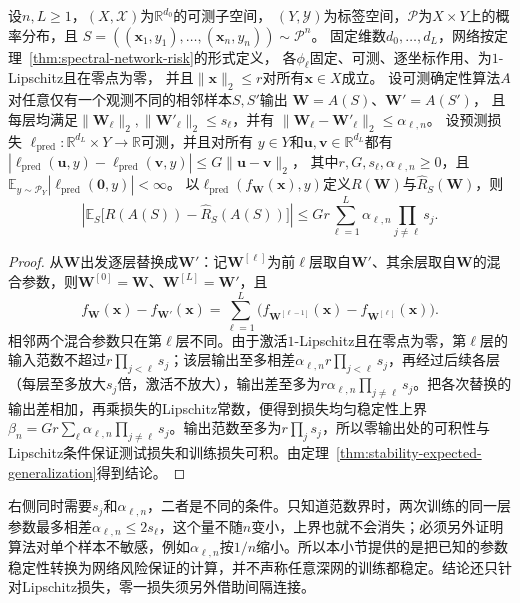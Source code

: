 \begin{theorem}[分层参数稳定性与期望泛化差]
\label{thm:layerwise-parameter-stability}
设$n,L\geq1$，$(X,\mathcal X)$为$\mathbb R^{d_0}$的可测子空间，
$(Y,\mathcal Y)$为标签空间，$\mathcal P$为$X\times Y$上的概率分布，且
$S=((\bm x_1,y_1),\ldots,(\bm x_n,y_n))\sim\mathcal P^n$。
固定维数$d_0,\ldots,d_L$，网络按定理~\ref{thm:spectral-network-risk}的形式定义，
各$\phi_\ell$固定、可测、逐坐标作用、为$1$-Lipschitz且在零点为零，
并且$\|\bm x\|_2\leq r$对所有$\bm x\in X$成立。
设可测确定性算法$A$对任意仅有一个观测不同的相邻样本$S,S'$输出
$\bm W=A(S)$、$\bm W'=A(S')$，
且每层均满足$\|\bm W_\ell\|_2,\|\bm W'_\ell\|_2\leq s_\ell$，并有
$\|\bm W_\ell-\bm W'_\ell\|_2\leq\alpha_{\ell,n}$。
设预测损失
$\ell_{\mathrm{pred}}:\mathbb R^{d_L}\times Y\to\mathbb R$可测，并且对所有
$y\in Y$和$\bm u,\bm v\in\mathbb R^{d_L}$都有
$|\ell_{\mathrm{pred}}(\bm u,y)-\ell_{\mathrm{pred}}(\bm v,y)|\leq G\|\bm u-\bm v\|_2$，
其中$r,G,s_\ell,\alpha_{\ell,n}\geq0$，且
$\mathbb E_{y\sim\mathcal P_Y}|\ell_{\mathrm{pred}}(\bm 0,y)|<\infty$。
以$\ell_{\mathrm{pred}}(f_{\bm W}(\bm x),y)$定义$R(\bm W)$与$\hat R_S(\bm W)$，则
\[
 \left|\mathbb E_S\bigl[R(A(S))-\hat R_S(A(S))\bigr]\right|
 \leq Gr\sum_{\ell=1}^L\alpha_{\ell,n}\prod_{j\ne\ell}s_j.
\]
\end{theorem}
\begin{proof}
从$\bm W$出发逐层替换成$\bm W'$：记$\bm W^{[\ell]}$为前$\ell$层取自$\bm W'$、其余层取自$\bm W$的混合参数，则$\bm W^{[0]}=\bm W$、$\bm W^{[L]}=\bm W'$，且
\[
 f_{\bm W}(\bm x)-f_{\bm W'}(\bm x)
 =\sum_{\ell=1}^L\bigl(f_{\bm W^{[\ell-1]}}(\bm x)-f_{\bm W^{[\ell]}}(\bm x)\bigr).
\]
相邻两个混合参数只在第$\ell$层不同。由于激活$1$-Lipschitz且在零点为零，第$\ell$层的输入范数不超过$r\prod_{j<\ell}s_j$；该层输出至多相差$\alpha_{\ell,n}r\prod_{j<\ell}s_j$，再经过后续各层（每层至多放大$s_j$倍，激活不放大），输出差至多为$r\alpha_{\ell,n}\prod_{j\ne\ell}s_j$。把各次替换的输出差相加，再乘损失的Lipschitz常数，便得到损失均匀稳定性上界$\beta_n=Gr\sum_\ell\alpha_{\ell,n}\prod_{j\ne\ell}s_j$。输出范数至多为$r\prod_js_j$，所以零输出处的可积性与Lipschitz条件保证测试损失和训练损失可积。由定理~\ref{thm:stability-expected-generalization}得到结论。
\end{proof}

右侧同时需要$s_j$和$\alpha_{\ell,n}$，二者是不同的条件。只知道范数界时，两次训练的同一层参数最多相差$\alpha_{\ell,n}\leq2s_\ell$，这个量不随$n$变小，上界也就不会消失；必须另外证明算法对单个样本不敏感，例如$\alpha_{\ell,n}$按$1/n$缩小。所以本小节提供的是把已知的参数稳定性转换为网络风险保证的计算，并不声称任意深网的训练都稳定。结论还只针对Lipschitz损失，零一损失须另外借助间隔连接。

